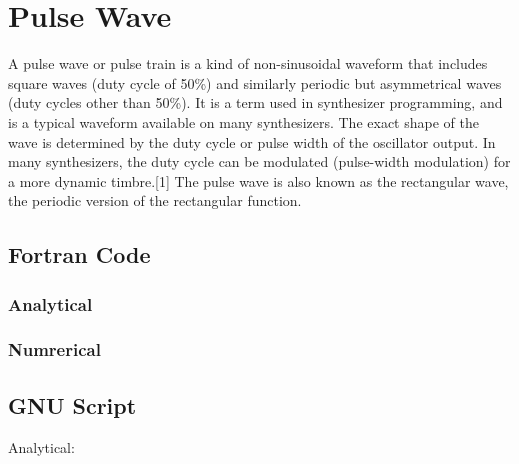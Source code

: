 \documentclass[oneside,hidelinks]{book}
\begin{document}
        \tableofcontents
        \parindent=0pt
        \parskip=3pt
        \chapter{Pulse Wave}
                A pulse wave or pulse train is a kind of non-sinusoidal waveform that includes square waves (duty cycle of 50\%)
                 and similarly periodic but asymmetrical waves (duty cycles other than 50\%).
                It is a term used in synthesizer programming, and is a typical waveform available on many synthesizers. 
                The exact shape of the wave is determined by the duty cycle or pulse width of the oscillator output. In many synthesizers, the duty cycle can be modulated (pulse-width modulation) for a more dynamic timbre.[1] The pulse wave is also known as the rectangular wave, the periodic version of the rectangular function.
                       \section{Fortran Code}
 
                        \subsection{Analytical}
                        \subsection{Numrerical}
                        \section{GNU Script}
                        Analytical:
                        

                  
\end{document}
